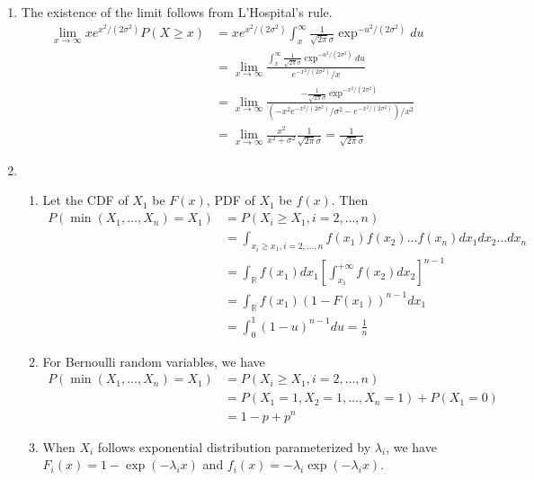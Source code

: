 \documentclass{article}
\begin{document}
\begin{enumerate}
\begin{enumerate}
\end{enumerate}
\item The existence of the limit follows
from L'Hospital's rule. 
\begin{align*}
    \lim_{x \to \infty} x e^{x^2/(2\sigma^2)}
    P(X\geq x) & = x e^{x^2/(2\sigma^2)}
    \int_{x}^{\infty} \frac{1}{\sqrt{2\pi}\sigma}
    \exp^{-u^2/(2\sigma^2)}du \\
        & = 
   \lim_{x \to \infty} \frac{ \int_{x}^{\infty} \frac{1}{\sqrt{2\pi}\sigma}
    \exp^{-u^2/(2\sigma^2)} du}
    {e^{-x^2/(2\sigma^2)} / x} \\
    &= \lim_{x \to \infty} \frac{ - \frac{1}{\sqrt{2\pi}\sigma}
    \exp^{-x^2/(2\sigma^2)}}
    {(-x^2e^{-x^2/(2\sigma^2)} / \sigma^2 -e^{-x^2/(2\sigma^2)} )/ x^2} \\
    &= \lim_{x \to \infty} \frac{x^2}{x^2+\sigma^2} \frac{1}{\sqrt{2\pi}\sigma}=\frac{1}{\sqrt{2\pi}\sigma}
\end{align*}
\item
\begin{enumerate}[label=(\roman*)]
    \item Let the CDF of $X_1$ be $F(x)$,
    PDF of $X_1$ be $f(x)$.
    Then
    \begin{align*}
        P(\min(X_1, \dots, X_n) = X_1)
        &= P(X_i \geq X_1, i=2,\dots,n) \\
        &=\int_{x_i \geq x_1, i=2,\dots,n}
        f(x_1)f(x_2) \dots f(x_n) dx_1dx_2\dots dx_n \\
        & = \int_{\mathbb{R}}
        f(x_1)dx_1 \left[\int_{x_1}^{+\infty} f(x_2)dx_2\right]^{n-1} \\
        & =  \int_{\mathbb{R}}
        f(x_1)(1-F(x_1))^{n-1}dx_1  \\
        & = \int_{0}^1 (1-u)^{n-1}du = \frac{1}{n}
    \end{align*}
    \item For Bernoulli random variables, we have
        \begin{align*}
        P(\min(X_1, \dots, X_n) = X_1)
        &= P(X_i \geq X_1, i=2,\dots,n) \\
        &=P(X_1=1,X_2=1,\dots, X_n=1) + P(X_1=0) \\
        &=1-p+p^n
    \end{align*}
    \item When $X_i$ follows exponential distribution
    parameterized by $\lambda_i$, we have $F_i(x)=1-\exp(-\lambda_i x)$
    and $f_i(x) = -\lambda_i \exp(-\lambda_i x)$.
        \begin{align*}

\end{align*}
\end{enumerate}
\end{enumerate}
\end{document}
